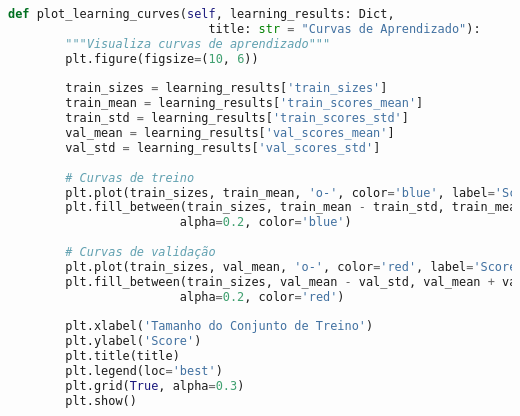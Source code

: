 \begin{pythonbox}
\begin{lstlisting}[language=Python]      
    def plot_learning_curves(self, learning_results: Dict, 
                            title: str = "Curvas de Aprendizado"):
        """Visualiza curvas de aprendizado"""
        plt.figure(figsize=(10, 6))
        
        train_sizes = learning_results['train_sizes']
        train_mean = learning_results['train_scores_mean']
        train_std = learning_results['train_scores_std']
        val_mean = learning_results['val_scores_mean']
        val_std = learning_results['val_scores_std']
        
        # Curvas de treino
        plt.plot(train_sizes, train_mean, 'o-', color='blue', label='Score de Treino')
        plt.fill_between(train_sizes, train_mean - train_std, train_mean + train_std, 
                        alpha=0.2, color='blue')
        
        # Curvas de validação
        plt.plot(train_sizes, val_mean, 'o-', color='red', label='Score de Validação')
        plt.fill_between(train_sizes, val_mean - val_std, val_mean + val_std, 
                        alpha=0.2, color='red')
        
        plt.xlabel('Tamanho do Conjunto de Treino')
        plt.ylabel('Score')
        plt.title(title)
        plt.legend(loc='best')
        plt.grid(True, alpha=0.3)
        plt.show()
\end{lstlisting}
\end{pythonbox}

\newpage

